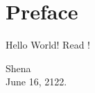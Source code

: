 \documentclass[a4paper,12pt]{article}
\begin{document}
\section*{Preface}
Hello World! Read \cite{author:book-title}!

\begin{flushright}
	Shena\\
	June 16, 2122.
\end{flushright}
\end{document}
